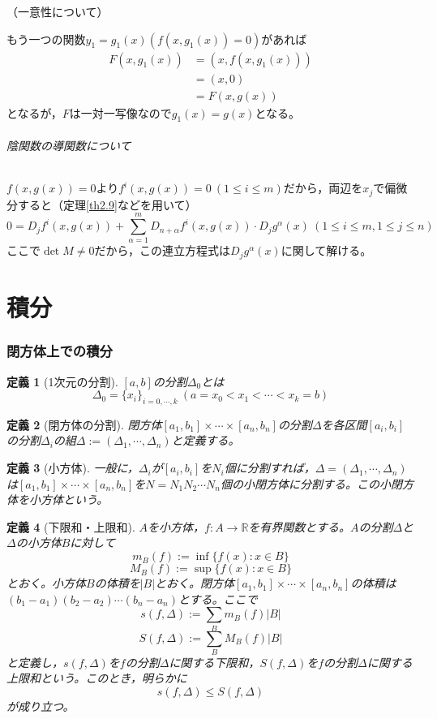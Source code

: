\documentclass[dvipdfmx,a4j,10pt]{jsarticle}
\makeatletter
\theoremstyle{mystyle1}
\theoremstyle{mystyle2}
\newtheorem{dfn*}{定義}
\renewenvironment{proof}[1][\proofname]{\par
  \pushQED{\qed}%
  \normalfont
  \topsep6\p@\@plus6\p@ \trivlist
  \item[\hskip\labelsep{\bfseries\sffamily #1}]\ignorespaces
}{%
  \popQED\endtrivlist\@endpefalse
}
\renewcommand\proofname{証明}
\makeatother
\begin{document}
\begin{proof}
	（一意性について）

	もう一つの関数$y_1=g_1(x)(f(x,g_1(x))=0)$があれば
	\[
	\begin{split}
		F(x,g_1(x))&=(x,f(x,g_1(x)))\\
		&=(x,0)\\
		&=F(x,g(x))
	\end{split}
	\]
	となるが，$F$は一対一写像なので$g_1(x)=g(x)$となる。

\end{proof}

\paragraph{陰関数の導関数について}

$f(x,g(x))=0$より$f^i(x,g(x))=0\ (1\leq i\leq m)$だから，両辺を$x_j$で偏微分すると（定理\ref{th2.9}などを用いて）
\[
0=D_jf^i(x,g(x))+\sum_{\alpha=1}^m D_{n+\alpha}f^i(x,g(x))\cdot D_jg^\alpha(x)\ (1\leq i\leq m,1\leq j\leq n)
\]
ここで$\det M\neq 0$だから，この連立方程式は$D_j g^\alpha(x)$に関して解ける。


\newpage


\part{積分}

\section{閉方体上での積分}
\begin{dfn*}[1次元の分割]
	$[a,b]$の分割$\Delta_0$とは
	\[
		\Delta_0=\{x_i\}_{i=0,\cdots,k}\ (a=x_0<x_1<\cdots<x_k=b)
	\]
\end{dfn*}
\begin{dfn*}[閉方体の分割]
閉方体$[a_1,b_1]\times \cdots \times [a_n,b_n]$の分割$\Delta$を各区間$[a_i,b_i]$の分割$\Delta_i$の組$\Delta:=(\Delta_1,\cdots,\Delta_n)$と定義する。
\end{dfn*}
\begin{dfn*}[小方体]
一般に，$\Delta_i$が$[a_i,b_i]$を$N_i$個に分割すれば，$\Delta=(\Delta_1,\cdots,\Delta_n)$は$[a_1,b_1]\times\cdots\times[a_n,b_n]$を$N=N_1N_2\cdots N_n$個の小閉方体に分割する。この小閉方体を小方体という。
\end{dfn*}
\begin{dfn*}[下限和・上限和]
$A$を小方体，$f:A\to\mathbb{R}$を有界関数とする。$A$の分割$\Delta$と$\Delta$の小方体$B$に対して
\[
	m_B(f):=\inf\{f(x):x\in B\}
\]
\[
	M_B(f):=\sup\{f(x):x\in B\}
\]
とおく。小方体$B$の体積を$|B|$とおく。閉方体$[a_1,b_1]\times\cdots\times[a_n,b_n]$の体積は$(b_1-a_1)(b_2-a_2)\cdots(b_n-a_n)$とする。ここで
\[
s(f,\Delta):=\sum_B m_B(f)|B|
\]
\[
S(f,\Delta):=\sum_B M_B(f)|B|
\]
と定義し，$s(f,\Delta)$を$f$の分割$\Delta$に関する下限和，$S(f,\Delta)$を$f$の分割$\Delta$に関する上限和という。このとき，明らかに
\[
s(f,\Delta)\leq S(f,\Delta)
\]
が成り立つ。
\end{dfn*}
\end{document}
